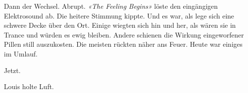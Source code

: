 
Dann der Wechsel. Abrupt. 
\emph{«The Feeling Begins»} löste den eingängigen Elektrosound ab. Die heitere Stimmung kippte. Und es war, als lege sich eine schwere  Decke über den Ort. Einige wiegten sich hin und her, als wären sie in Trance und würden es ewig bleiben. Andere schienen die Wirkung eingeworfener Pillen still auszukosten. Die meisten rückten näher ans Feuer. Heute war einiges im Umlauf.


Jetzt.

Louis holte Luft.

